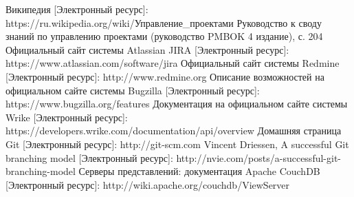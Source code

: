 \documentclass[14pt, a4paper]{extreport}
\begin{document}
\newpage
\clearpage
%
\begin{thebibliography}{}
 Википедия [Электронный ресурс]: \\https://ru.wikipedia.org/wiki/Управление\_проектами
 Руководство к своду знаний по управлению проектами (руководство PMBOK 4 издание), с. 204
 Официальный сайт системы Atlassian JIRA [Электронный ресурс]: https://www.atlassian.com/software/jira
 Официальный сайт системы Redmine [Электронный ресурс]: http://www.redmine.org
 Описание возможностей на официальном сайте системы Bugzilla [Электронный ресурс]: https://www.bugzilla.org/features
 Документация на официальном сайте системы Wrike [Электронный ресурс]: https://developers.wrike.com/documentation/api/overview
 Домашняя страница Git [Электронный ресурс]: http://git-scm.com
 Vincent Driessen, A successful Git branching model [Электронный ресурс]: http://nvie.com/posts/a-successful-git-branching-model
 Серверы представлений: документация Apache CouchDB [Электронный ресурс]: http://wiki.apache.org/couchdb/ViewServer
\end{thebibliography}
\end{document}
